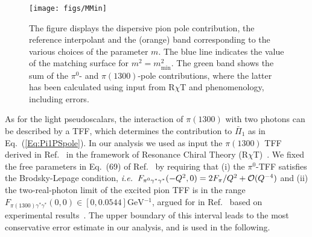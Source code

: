 \begin{figure*}
	\centering
	\texttt{[image: figs/MMin]}

	\caption{The figure displays the dispersive pion pole contribution, the reference interpolant and the (orange) band corresponding to the various choices of the parameter $m$. The blue line indicates the value of the matching surface for $m^2 = m_\text{min}^2$. The green band shows the sum of the $\pi^0$- and $\pi(1300)$-pole contributions, where the latter has been calculated using input from R$\chi$T and phenomenology, including errors.}
	\label{Fig:mFromRChiT}
\end{figure*}

As for the light pseudoscalars, the interaction of $\pi(1300)$ with two photons can be described by a TFF, which determines the contribution to $\bar{\Pi}_1$ as in Eq.~(\ref{Eq:Pi1PSpole}).
In our analysis we used as input the $\pi(1300)$ TFF derived in Ref.~\cite{KampfRChiT} in the framework of Resonance Chiral Theory (R$\chi$T)~\cite{RChiT}. We fixed the free parameters in Eq.~(69) of Ref.~\cite{KampfRChiT} by requiring that (i) the $\pi^0$-TFF satisfies the Brodsky-Lepage condition, {\it i.e.}\ $F_{\pi^0\gamma^*\gamma^*}(-Q^2,0) = 2 F_\pi/Q^2 +\mathcal{O}(Q^{-4})$ and (ii) the two-real-photon limit of the excited pion TFF is in the range $F_{\pi(1300)\gamma^*\gamma^*}(0,0)\in[0,\num{0.0544}]\si{\GeV^{-1}}$, argued for in Ref.~\cite{BernSDCLong} based on experimental results~\cite{Acciarri:1997rb,Salvini:2004gz}. The upper boundary of this interval leads to the most conservative error estimate in our analysis, and is used in the following. 

